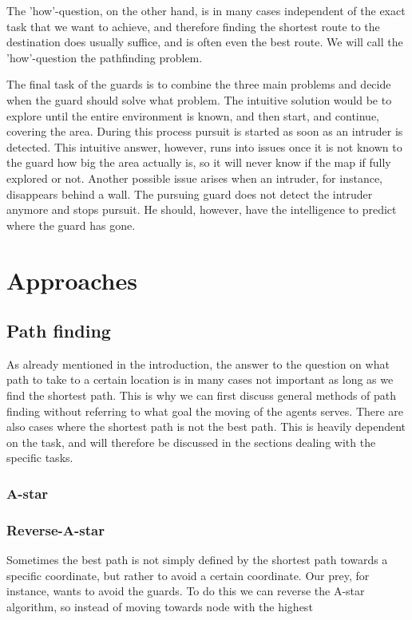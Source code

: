 \documentclass[a4paper]{report}
\begin{document}
	The 'how'-question, on the other hand, is in many cases independent of the exact task that we want to achieve, and therefore finding the shortest route to the destination does usually suffice, and is often even the best route. We will call the 'how'-question the pathfinding problem.

	The final task of the guards is to combine the three main problems and decide when the guard should solve what problem. The intuitive solution would be to explore until the entire environment is known, and then start, and continue, covering the area. During this process pursuit is started as soon as an intruder is detected. This intuitive answer, however, runs into issues once it is not known to the guard how big the area actually is, so it will never know if the map if fully explored or not. Another possible issue arises when an intruder, for instance, disappears behind a wall. The pursuing guard does not detect the intruder anymore and stops pursuit. He should, however, have the intelligence to predict where the guard has gone.

\chapter{Approaches}
	
	\section{Path finding}
		As already mentioned in the introduction, the answer to the question on what path to take to a certain location is in many cases not important as long as we find the shortest path. This is why we can first discuss general methods of path finding without referring to what goal the moving of the agents serves. There are also cases where the shortest path is not the best path. This is heavily dependent on the task, and will therefore be discussed in the sections dealing with the specific tasks.

		\subsection{A-star}
			
		
		\subsection{Reverse-A-star}
		    Sometimes the best path is not simply defined by the shortest path towards a specific coordinate, but rather to avoid a certain coordinate. Our prey, for instance, wants to avoid the guards. To do this we can reverse the A-star algorithm, so instead of moving towards node with the highest
\end{document}
